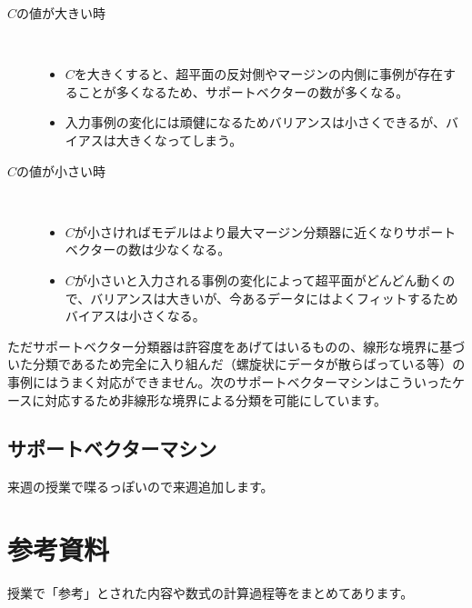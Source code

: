 \documentclass[uplatex]{jsarticle}
\begin{document}
\begin{description}
  \item[$C$の値が大きい時]\mbox{}\\
  \begin{itemize}
    \item $C$を大きくすると、超平面の反対側やマージンの内側に事例が存在することが多くなるため、サポートベクターの数が多くなる。
    \item 入力事例の変化には頑健になるためバリアンスは小さくできるが、バイアスは大きくなってしまう。
  \end{itemize}
  \item[$C$の値が小さい時]\mbox{}\\
  \begin{itemize}
    \item $C$が小さければモデルはより最大マージン分類器に近くなりサポートベクターの数は少なくなる。
    \item $C$が小さいと入力される事例の変化によって超平面がどんどん動くので、バリアンスは大きいが、今あるデータにはよくフィットするためバイアスは小さくなる。
  \end{itemize}
\end{description}

ただサポートベクター分類器は許容度をあげてはいるものの、線形な境界に基づいた分類であるため完全に入り組んだ（螺旋状にデータが散らばっている等）の事例にはうまく対応ができません。次のサポートベクターマシンはこういったケースに対応するため非線形な境界による分類を可能にしています。
\subsection{サポートベクターマシン}
来週の授業で喋るっぽいので来週追加します。


\section{参考資料}
授業で「参考」とされた内容や数式の計算過程等をまとめてあります。
\end{document}
